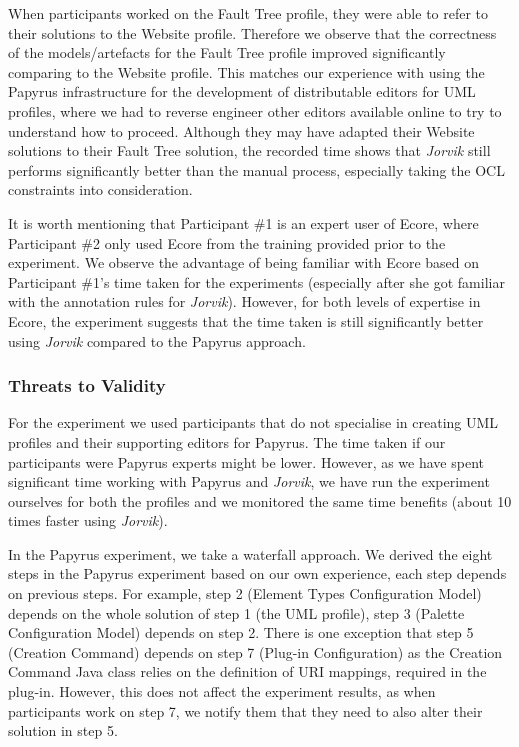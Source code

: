 When participants worked on the Fault Tree profile, they were able to refer to their solutions to the Website profile. 
Therefore we observe that the correctness of the models/artefacts for the Fault Tree profile improved significantly comparing to the Website profile. This matches our experience with using the Papyrus infrastructure for the development of distributable editors for UML profiles, where we had to reverse engineer other editors available online to try to understand how to proceed.
Although they may have adapted their Website solutions to their Fault Tree solution, the recorded time shows that \textit{Jorvik} still performs significantly better than the manual process, especially taking the OCL constraints into consideration.

It is worth mentioning that Participant \#1 is an expert user of Ecore, where Participant \#2 only used Ecore from the training provided prior to the experiment. 
We observe the advantage of being familiar with Ecore based on Participant \#1's time taken for the experiments (especially after she got familiar with the annotation rules for \textit{Jorvik}).
However, for both levels of expertise in Ecore, the experiment suggests that the time taken is still significantly better using \textit{Jorvik} compared to the Papyrus approach.

\subsubsection{Threats to Validity}
For the experiment we used participants that do not specialise in creating UML profiles and their supporting editors for Papyrus. The time taken if our participants were Papyrus experts might be lower.
However, as we have spent significant time working with Papyrus and \textit{Jorvik}, we have run the experiment ourselves for both the profiles and we monitored the same time benefits (about 10 times faster using \textit{Jorvik}). 

In the Papyrus experiment, we take a waterfall approach.
We derived the eight steps in the Papyrus experiment based on our own experience, each step depends on previous steps. 
For example, step 2 (Element Types Configuration Model) depends on the whole solution of step 1 (the UML profile), step 3 (Palette Configuration Model) depends on step 2. 
There is one exception that step 5 (Creation Command) depends on step 7 (Plug-in Configuration) as the Creation Command Java class relies on the definition of URI mappings, required in the plug-in. 
However, this does not affect the experiment results, as when participants work on step 7, we notify them that they need to also alter their solution in step 5.

